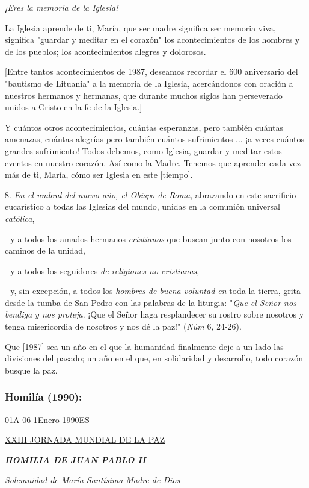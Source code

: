 \begin{body}
\emph{¡Eres la memoria de la Iglesia!}

La Iglesia aprende de ti, María, que ser madre significa ser memoria viva, significa "guardar y meditar en el corazón" los acontecimientos de los hombres y de los pueblos; los acontecimientos alegres y dolorosos.

{[}Entre tantos acontecimientos de 1987, deseamos recordar el 600 aniversario del "bautismo de Lituania" a la memoria de la Iglesia, acercándonos con oración a nuestros hermanos y hermanas, que durante muchos siglos han perseverado unidos a Cristo en la fe de la Iglesia.{]}

Y cuántos otros acontecimientos, cuántas esperanzas, pero también cuántas amenazas, cuántas alegrías pero también cuántos sufrimientos ... ¡a veces cuántos grandes sufrimiento! Todos debemos, como Iglesia, guardar y meditar estos eventos en nuestro corazón. Así como la Madre. Tenemos que aprender cada vez más de ti, María, cómo ser Iglesia en este {[}tiempo{]}.

8. \emph{En el umbral del nuevo año, el Obispo de Roma}, abrazando en este sacrificio eucarístico a todas las Iglesias del mundo, unidas en la comunión universal \emph{católica},

- y a todos los amados hermanos \emph{cristianos} que buscan junto con nosotros los caminos de la unidad,

- y a todos los seguidores \emph{de religiones no cristianas},

- y, sin excepción, a todos los \emph{hombres de buena voluntad en} toda la tierra, grita desde la tumba de San Pedro con las palabras de la liturgia: "\emph{Que el Señor nos bendiga y nos proteja}. ¡Que el Señor haga resplandecer su rostro sobre nosotros y tenga misericordia de nosotros y nos dé la paz!" (\emph{Núm} 6, 24-26).

Que {[}1987{]} sea un año en el que la humanidad finalmente deje a un lado las divisiones del pasado; un año en el que, en solidaridad y desarrollo, todo corazón busque la paz.

\subsubsection{Homilía (1990): } 01A-06-1Enero-1990ES

\href{http://www.vatican.va/gmg/years/gmg_1990_it.html}{XXIII JORNADA 	MUNDIAL DE LA PAZ}

\emph{\textbf{HOMILIA DE JUAN PABLO II}}

\emph{Solemnidad de María Santísima Madre de Dios}


\end{body}
